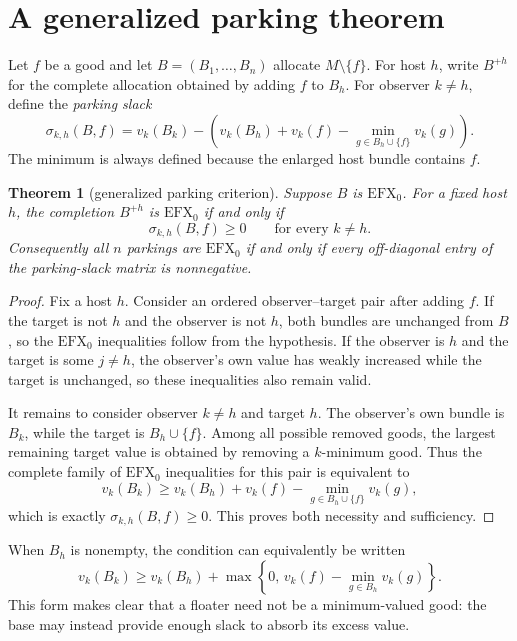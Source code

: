 \documentclass[11pt]{article}
\theoremstyle{plain}
\newtheorem{theorem}{Theorem}[section]
\theoremstyle{definition}
\newcommand{\efxo}{\mathrm{EFX}_0}
\begin{document}
\section{A generalized parking theorem}\label{sec:parking}

Let $f$ be a good and let $B=(B_1,\ldots,B_n)$ allocate $M\setminus\{f\}$.
For host $h$, write $B^{+h}$ for the complete allocation obtained by adding $f$
to $B_h$.  For observer $k\ne h$, define the \emph{parking slack}
\begin{equation}\label{eq:slack}
\sigma_{k,h}(B,f)
 =
 v_k(B_k)-
 \left(
   v_k(B_h)+v_k(f)
   -\min_{g\in B_h\cup\{f\}}v_k(g)
 \right).
\end{equation}
The minimum is always defined because the enlarged host bundle contains $f$.

\begin{theorem}[generalized parking criterion]\label{thm:parking}
Suppose $B$ is $\efxo$.  For a fixed host $h$, the completion $B^{+h}$ is
$\efxo$ if and only if
\[
  \sigma_{k,h}(B,f)\ge0
  \qquad\text{for every }k\ne h.
\]
Consequently all $n$ parkings are $\efxo$ if and only if every off-diagonal
entry of the parking-slack matrix is nonnegative.
\end{theorem}

\begin{proof}
Fix a host $h$.  Consider an ordered observer--target pair after adding $f$.
If the target is not $h$ and the observer is not $h$, both bundles are unchanged
from $B$, so the $\efxo$ inequalities follow from the hypothesis.  If the
observer is $h$ and the target is some $j\ne h$, the observer's own value has
weakly increased while the target is unchanged, so these inequalities also
remain valid.

It remains to consider observer $k\ne h$ and target $h$.  The observer's own
bundle is $B_k$, while the target is $B_h\cup\{f\}$.  Among all possible removed
goods, the largest remaining target value is obtained by removing a
$k$-minimum good.  Thus the complete family of $\efxo$ inequalities for this
pair is equivalent to
\[
v_k(B_k)\ge
v_k(B_h)+v_k(f)-\min_{g\in B_h\cup\{f\}}v_k(g),
\]
which is exactly $\sigma_{k,h}(B,f)\ge0$.  This proves both necessity and
sufficiency.
\end{proof}

When $B_h$ is nonempty, the condition can equivalently be written
\[
v_k(B_k)\ge
v_k(B_h)+
\max\!\left\{0,\,
v_k(f)-\min_{g\in B_h}v_k(g)\right\}.
\]
This form makes clear that a floater need not be a minimum-valued good: the base
may instead provide enough slack to absorb its excess value.
\end{document}
